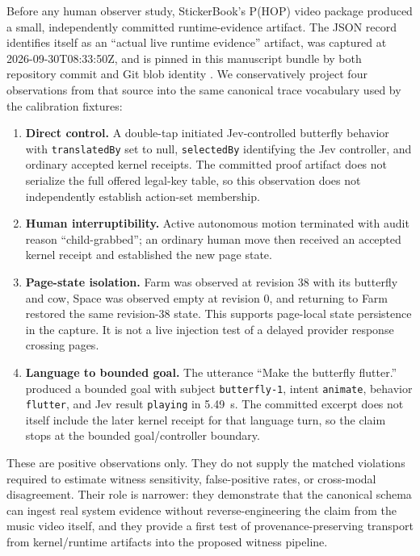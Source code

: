 \documentclass[11pt]{article}
\begin{document}
Before any human observer study, StickerBook's P(HOP) video package produced a small, independently committed runtime-evidence artifact. The JSON record identifies itself as an ``actual live runtime evidence'' artifact, was captured at 2026-09-30T08:33:50Z, and is pinned in this manuscript bundle by both repository commit and Git blob identity \citep{tiffany2026stickerbookproof}. We conservatively project four observations from that source into the same canonical trace vocabulary used by the calibration fixtures:
\begin{enumerate}[leftmargin=*]
    \item \textbf{Direct control.} A double-tap initiated Jev-controlled butterfly behavior with \texttt{translatedBy} set to null, \texttt{selectedBy} identifying the Jev controller, and ordinary accepted kernel receipts. The committed proof artifact does not serialize the full offered legal-key table, so this observation does not independently establish action-set membership.
    \item \textbf{Human interruptibility.} Active autonomous motion terminated with audit reason ``child-grabbed''; an ordinary human move then received an accepted kernel receipt and established the new page state.
    \item \textbf{Page-state isolation.} Farm was observed at revision 38 with its butterfly and cow, Space was observed empty at revision 0, and returning to Farm restored the same revision-38 state. This supports page-local state persistence in the capture. It is not a live injection test of a delayed provider response crossing pages.
    \item \textbf{Language to bounded goal.} The utterance ``Make the butterfly flutter.'' produced a bounded goal with subject \texttt{butterfly-1}, intent \texttt{animate}, behavior \texttt{flutter}, and Jev result \texttt{playing} in 5.49~s. The committed excerpt does not itself include the later kernel receipt for that language turn, so the claim stops at the bounded goal/controller boundary.
\end{enumerate}

These are positive observations only. They do not supply the matched violations required to estimate witness sensitivity, false-positive rates, or cross-modal disagreement. Their role is narrower: they demonstrate that the canonical schema can ingest real system evidence without reverse-engineering the claim from the music video itself, and they provide a first test of provenance-preserving transport from kernel/runtime artifacts into the proposed witness pipeline.
\end{document}
